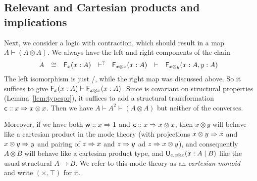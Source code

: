 \subsection{Relevant and Cartesian products and implications}
\label{sec:ex:relevant-cartesian}

Next, we consider a logic with contraction, which should result in a map
$A \vdash (A \otimes A)$.  We always have the left and right components
of the chain
\[
\begin{array}{llllllll}
A & \cong & \mathsf{F}_{x}(x:A)  & \vdash^? & \mathsf{F}_{x \otimes x}(x:A) & \vdash & \mathsf{F}_{x \otimes y}(x:A, y : A)
\end{array}
\]
The left isomorphism is just \FL/\FR, while the right map was discussed
above.  So it suffices to give $\mathsf{F}_{x}(x:A) \vdash \mathsf{F}_{x
  \otimes x}(x:A)$.  Since  is covariant on structural properties
(Lemma~\ref{lem:typespr}), it suffices to add a structural transformation
$\mathsf{c} :: x \Rightarrow x \otimes x$.  Then we have $A \vdash A^2 \vdash (A
\otimes A)$ but neither of the converses.

Moreover, if we have both $\mathsf{w} :: x \Rightarrow 1$ and $\mathsf{c} :: x \Rightarrow x
\otimes x$, then $x \otimes y$ will behave like a cartesian product in
the mode theory (with projections $x \otimes y \Rightarrow x$ and $x \otimes y
\Rightarrow y$ and pairing of $z \Rightarrow x$ and $z \Rightarrow y$ ad $z \Rightarrow x \otimes
y$), and consequently $A \otimes B$ will behave like a cartesian product
type, and $\mathsf{U}_{c.c \otimes x}(x:A \mid B)$ like the usual structural $A \to B$.
We refer to this mode theory as an
\emph{cartesian monoid} and write $(\times,\top)$ for it.


